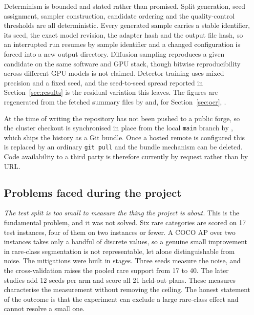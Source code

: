Determinism is bounded and stated rather than promised. Split generation, seed
assignment, sampler construction, candidate ordering and the quality-control
thresholds are all deterministic. Every generated sample carries a stable
identifier, its seed, the exact model revision, the adapter hash and the output
file hash, so an interrupted run resumes by sample identifier and a changed
configuration is forced into a new output directory. Diffusion sampling
reproduces a given candidate on the same software and GPU stack, though bitwise
reproducibility across different GPU models is not claimed. Detector training
uses mixed precision and a fixed seed, and the seed-to-seed spread reported in
Section~\ref{sec:results} is the residual variation this leaves. The figures are
regenerated from the fetched summary files by
\protect{} and, for Section~\ref{sec:ocr},
\protect{}.

At the time of writing the repository has not been pushed to a public forge, so
the cluster checkout is synchronised in place from the local \texttt{main}
branch by \protect{}, which ships the history as a Git
bundle. Once a hosted remote is configured this is replaced by an ordinary
\texttt{git pull} and the bundle mechanism can be deleted. Code availability to
a third party is therefore currently by request rather than by URL.

\subsection{Problems faced during the project}
\label{sec:problems}

\emph{The test split is too small to measure the thing the project is about.}
This is the fundamental problem, and it was not solved. Six rare categories are
scored on 17 test instances, four of them on two instances or fewer. A COCO AP
over two instances takes only a handful of discrete values, so a genuine small
improvement in rare-class segmentation is not representable, let alone
distinguishable from noise. The mitigations were built in stages. Three seeds measure the
noise, and the cross-validation raises the pooled rare support from 17 to 40.
The later studies add 12 seeds per arm and score all 21 held-out plans.
These measures characterise the measurement without removing the ceiling. The
honest statement of the outcome is that the experiment can exclude a large
rare-class effect and cannot resolve a small one.

